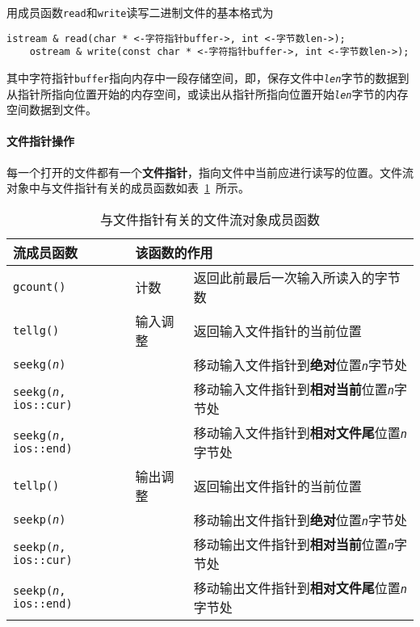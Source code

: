 \documentclass[10pt, a4paper, oneside, fontset=none]{ctexart}
\theoremstyle{plain}
\theoremstyle{definition}
\begin{document}
用成员函数\texttt{read}和\texttt{write}读写二进制文件的基本格式为
\begin{lstlisting}[style=intro]
	istream & read(char * <-字符指针buffer->, int <-字节数len->);
	ostream & write(const char * <-字符指针buffer->, int <-字节数len->);
\end{lstlisting}
其中字符指针\texttt{buffer}指向内存中一段存储空间，即，保存文件中\texttt{\textit{len}}字节的数据到从指针所指向位置开始的内存空间，或读出从指针所指向位置开始\texttt{\textit{len}}字节的内存空间数据到文件。

\paragraph{文件指针操作}

每一个打开的文件都有一个\textbf{文件指针}，指向文件中当前应进行读写的位置。文件流对象中与文件指针有关的成员函数如表~\ref{Tab: 文件指针函数}~所示。
\begin{table}[ht!]
	\caption{与文件指针有关的文件流对象成员函数}\label{Tab: 文件指针函数}
	\centering
	\begin{tabular}{lll}
		\toprule
		\textbf{流成员函数} & \multicolumn{2}{l}{\textbf{该函数的作用}}\\
		\midrule
		\texttt{gcount()} & 计数 & 返回此前最后一次输入所读入的字节数 \\
		\texttt{tellg()} & 输入调整 & 返回输入文件指针的当前位置 \\
		\texttt{seekg(\textit{n})} & ~ & 移动输入文件指针到\textbf{绝对}位置\texttt{\textit{n}}字节处 \\
		\texttt{seekg(\textit{n}, ios::cur)} & ~ & 移动输入文件指针到\textbf{相对当前}位置\texttt{\textit{n}}字节处 \\
		\texttt{seekg(\textit{n}, ios::end)} & ~ & 移动输入文件指针到\textbf{相对文件尾}位置\texttt{\textit{n}}字节处 \\
		\texttt{tellp()} & 输出调整 & 返回输出文件指针的当前位置 \\
		\texttt{seekp(\textit{n})} & ~ & 移动输出文件指针到\textbf{绝对}位置\texttt{\textit{n}}字节处 \\
		\texttt{seekp(\textit{n}, ios::cur)} & ~ & 移动输出文件指针到\textbf{相对当前}位置\texttt{\textit{n}}字节处 \\
		\texttt{seekp(\textit{n}, ios::end)} & ~ & 移动输出文件指针到\textbf{相对文件尾}位置\texttt{\textit{n}}字节处 \\
		\bottomrule
	\end{tabular}
\end{table}
\end{document}
